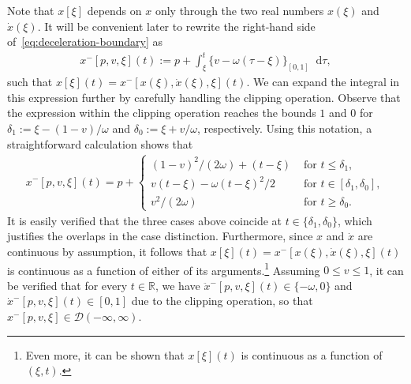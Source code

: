 \documentclass[a4paper]{article}
\theoremstyle{definition}
\theoremstyle{plain}
\newcommand*\diff{\mathop{}\!\mathrm{d}}
\begin{document}
Note that $x[\xi]$ depends on $x$ only through the two real numbers $x(\xi)$ and
$\dot{x}(\xi)$. It will be convenient later to rewrite the right-hand side
of~\eqref{eq:deceleration-boundary} as
\begin{align}\label{eq:def-x-}
  x^{-}[p, v, \xi](t) := p + \int_{\xi}^{t} \{ v - \omega(\tau - \xi) \}_{[0,1]} \diff \tau ,
\end{align}
such that $x[\xi](t) = x^{-}[x(\xi), \dot{x}(\xi), \xi](t)$.
%
We can expand the integral in this expression further by carefully handling the
clipping operation. Observe that the expression within the clipping operation
reaches the bounds $1$ and $0$ for $\delta_{1} := \xi - (1-v)/\omega$ and
$\delta_{0} := \xi + v/\omega$, respectively. Using this notation, a straightforward
calculation shows that
\begin{align}\label{eq:x-}
  x^{-}[p,v,\xi](t) = p +
  \begin{cases}
    {(1 - v)}^{2} / (2\omega) + (t - \xi) & \text{ for } t \leq \delta_{1} , \\
    v(t - \xi) - \omega{(t-\xi)}^{2} /2 & \text{ for } t \in [\delta_{1} , \delta_{0}] , \\
    v^{2}/(2\omega) & \text{ for } t \geq \delta_{0} .
  \end{cases}
\end{align}
%
It is easily verified that the three cases above coincide at
$t \in \{\delta_{1}, \delta_{0}\}$, which justifies the overlaps in the case distinction.
Furthermore, since $x$ and $\dot{x}$ are continuous by assumption, it follows
that $x[\xi](t) = x^{-}[x(\xi), \dot{x}(\xi), \xi](t)$ is continuous as a function of
either of its arguments.\footnote{Even more, it can be shown that $x[\xi](t)$ is continuous as a function of $(\xi, t)$.}
%
Assuming $0 \leq v \leq 1$, it can be verified that for every $t \in \mathbb{R}$, we
have $\ddot{x}^{-}[p,v,\xi](t) \in \{-\omega, 0\}$ and
$\dot{x}^{-}[p,v,\xi](t) \in [0,1]$ due to the clipping operation, so that
$x^{-}[p,v,\xi] \in \mathcal{D}(-\infty,\infty)$.
\end{document}
